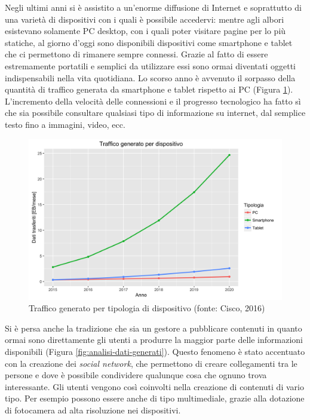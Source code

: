 Negli ultimi anni si è assistito a un'enorme diffusione di Internet e soprattutto di una varietà di dispositivi con i quali è possibile accedervi: mentre agli albori esistevano solamente PC desktop, con i quali poter visitare pagine per lo più statiche, al giorno d'oggi sono disponibili dispositivi come smartphone e tablet che ci permettono di rimanere sempre connessi. Grazie al fatto di essere estremamente portatili e semplici da utilizzare essi sono ormai diventati oggetti indispensabili nella vita quotidiana. Lo scorso anno è avvenuto il sorpasso della quantità di traffico generata da smartphone e tablet rispetto ai PC (Figura \ref{fig:traffico-tipologia-dispositivo}). L'incremento della velocità delle connessioni e il progresso tecnologico ha fatto sì che sia possibile consultare qualsiasi tipo di informazione su internet, dal semplice testo fino a immagini, video, ecc.

\begin{figure}[ht]
	\centering
	\includegraphics[width=\textwidth]{1-introduzione/Immagini/traffico-dispositivi.png}
	\caption[Traffico generato per tipologia di dispositivo]{Traffico generato per tipologia di dispositivo (fonte: Cisco, 2016)\label{fig:traffico-tipologia-dispositivo}}
\end{figure}

Si è persa anche la tradizione che sia un gestore a pubblicare contenuti in quanto ormai sono direttamente gli utenti a produrre la maggior parte delle informazioni disponibili (Figura \ref{fig:analisi-dati-generati}). Questo fenomeno è stato accentuato con la creazione dei \emph{social network}, che permettono di creare collegamenti tra le persone e dove è possibile condividere qualunque cosa che ognuno trova interessante. Gli utenti vengono così coinvolti nella creazione di contenuti di vario tipo. Per esempio possono essere anche di tipo multimediale, grazie alla dotazione di fotocamera ad alta risoluzione nei dispositivi.

